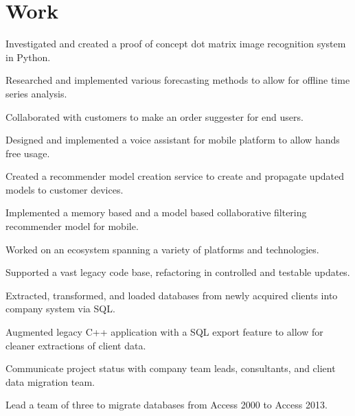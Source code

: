 \documentclass{marvinkassabian_resume}
\begin{document}
	\section{Work}
			\resumesublistbegin
				\item[] 
					\resumesublistbegin
						\item Investigated and created a proof of concept dot matrix image recognition system in Python.
						\item Researched and implemented various forecasting methods to allow for offline time series analysis.
						\item Collaborated with customers to make an order suggester for end users.
						\item Designed and implemented a voice assistant for mobile platform to allow hands free usage. 
						\item Created a recommender model creation service to create and propagate updated models to customer devices.
						\item Implemented a memory based and a model based collaborative filtering recommender model for mobile.
						\item Worked on an ecosystem spanning a variety of platforms and technologies.
						\item Supported a vast legacy code base, refactoring in controlled and testable updates.
					\resumesublistend
				\item[] 
					\resumesublistbegin
						\item Extracted, transformed, and loaded databases from newly acquired clients into company system via SQL.
						\item Augmented legacy C++ application with a SQL export feature to allow for cleaner extractions of client data.
						\item Communicate project status with company team leads, consultants, and client data migration team.
					\resumesublistend
			\resumesublistend
			\resumesublistbegin
				\item[] 
					\resumesublistbegin
						\item Lead a team of three to migrate databases from Access 2000 to Access 2013.
\end{document}
